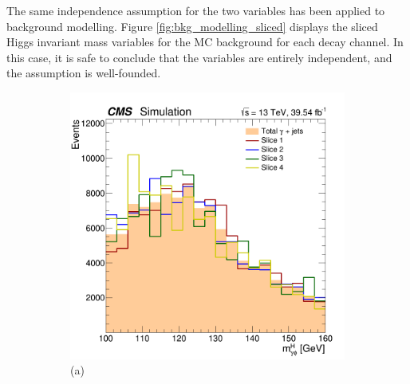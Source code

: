 The same independence assumption for the two variables has been applied to background modelling. Figure \ref{fig:bkg_modelling_sliced} displays the sliced Higgs invariant mass variables for the MC background for each decay channel. In this case, it is safe to conclude that the variables are entirely independent, and the assumption is well-founded.
\begin{figure}[!ht]
    \captionsetup[subfigure]{labelformat=empty}
    \vspace*{-0.2cm}
    \centering
    \setlength{\mylength}{\textwidth}
    \begin{subfigure}[t]{0.50\mylength}
        \centering
        \includegraphics[width=0.49\mylength]{resources/plots/Phi3_fit_BKG_MH_sliced.png}
        \vspace*{-0.2cm}
        \caption{\footnotesize (a)}
    \end{subfigure}%
    \begin{subfigure}[t]{0.50\mylength}
        \centering

\end{subfigure}
\end{figure}
